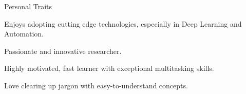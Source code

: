 
\begin{rSection}{Personal Traits}
    \begin{rSubsection}{}{}{}{}
        \item Enjoys adopting cutting edge technologies, especially in Deep Learning and Automation.
        \item Passionate and innovative researcher.
        \item Highly motivated, fast learner with exceptional multitasking skills.
        \item Love clearing up jargon with easy-to-understand concepts.
    \end{rSubsection}
\end{rSection}